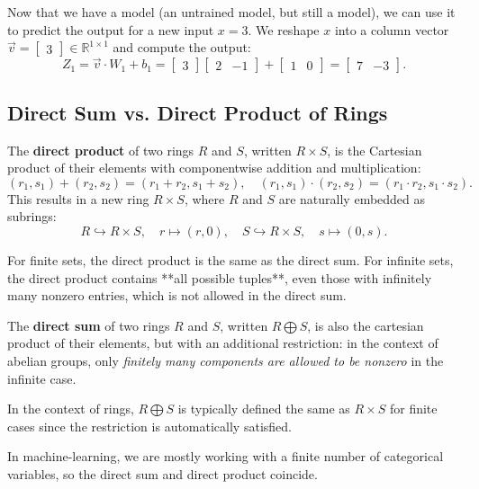 \begin{enumerate}
    Now that we have a model (an untrained model, but still a model), we can use it to predict the output for a new input $x=3$. We reshape $x$ into a column vector $\vec{v} = \begin{bmatrix}3\end{bmatrix} \in \mathbb{R}^{1\times 1}$ and compute the output:
    $$Z_1 = \vec{v}\cdot W_1 + b_1 = \begin{bmatrix} 3 \end{bmatrix} \begin{bmatrix} 2 & -1 \end{bmatrix} + \begin{bmatrix} 1 & 0 \end{bmatrix} = \begin{bmatrix} 7 & -3 \end{bmatrix}.$$
\end{enumerate}

\subsection{Direct Sum vs. Direct Product of Rings}
\label{sec:direct-sum-vs-direct-product}
\begin{definition}
    The \textbf{direct product} of two rings $R$ and $S$, written $R\times S$, is the Cartesian product of their elements with componentwise addition and multiplication:
    $$(r_1, s_1) + (r_2, s_2) = (r_1 + r_2, s_1 + s_2), \quad (r_1, s_1) \cdot (r_2, s_2) = (r_1 \cdot r_2, s_1 \cdot s_2).$$
    This results in a new ring $R\times S$, where $R$ and $S$ are naturally embedded as subrings:
    $$R \hookrightarrow R \times S, \quad r \mapsto (r, 0), \quad S \hookrightarrow R \times S, \quad s \mapsto (0, s).$$
    \end{definition}
    
    For finite sets, the direct product is the same as the direct sum. For infinite sets, the direct product contains **all possible tuples**, even those with infinitely many nonzero entries, which is not allowed in the direct sum.
    
    \begin{definition}
    The \textbf{direct sum} of two rings $R$ and $S$, written $R\bigoplus S$, is also the cartesian product of their elements, but with an additional restriction: in the context of abelian groups, only \textit{finitely many components are allowed to be nonzero} in the infinite case. 
    \end{definition}
    
    In the context of rings, $R\bigoplus S$ is typically defined the same as $R\times S$ for finite cases since the restriction is automatically satisfied.
    
    In machine-learning, we are mostly working with a finite number of categorical variables, so the direct sum and direct product coincide.